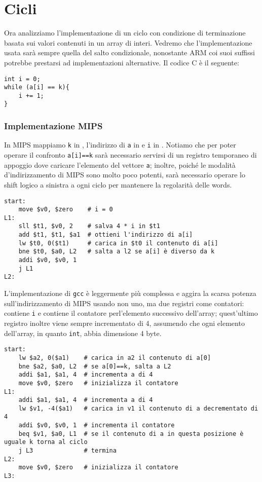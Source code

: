 \documentclass[class=book, crop=false, oneside]{standalone}
\begin{document}
\section{Cicli}
Ora analizziamo l'implementazione di un ciclo con condizione di terminazione basata sui valori contenuti in un array di interi. Vedremo che l'implementazione usata sarà sempre quella del salto condizionale, nonostante ARM coi suoi suffissi potrebbe prestarsi ad implementazioni alternative. Il codice C è il seguente:
\begin{verbatim}
int i = 0;
while (a[i] == k){
	i += 1;
}
\end{verbatim}

\subsubsection{Implementazione MIPS}
In MIPS mappiamo \texttt{k} in , l'indirizzo di \texttt{a} in  e \texttt{i} in . Notiamo che per poter operare il confronto \texttt{a[i]==k} sarà necessario servirsi di un registro temporaneo  di appoggio dove caricare l'elemento del vettore \texttt{a}; inoltre, poiché le modalità d'indirizzamento di MIPS sono molto poco potenti, sarà necessario operare lo shift logico a sinistra a ogni ciclo per mantenere la regolarità delle words.
\begin{verbatim}
start:
	move $v0, $zero    # i = 0
L1:
	sll $t1, $v0, 2    # salva 4 * i in $t1
	add $t1, $t1, $a1  # ottieni l'indirizzo di a[i]
	lw $t0, 0($t1)     # carica in $t0 il contenuto di a[i]
	bne $t0, $a0, L2   # salta a l2 se a[i] è diverso da k
	addi $v0, $v0, 1
	j L1
L2:
\end{verbatim}

L'implementazione di \texttt{gcc} è leggermente più complessa e aggira la scarsa potenza sull'indirizzamento di MIPS usando non uno, ma due registri come contatori:   contiene \texttt{i} e  contiene il contatore perl'elemento successivo dell'array; quest'ultimo registro inoltre viene sempre incrementato di 4, assumendo che ogni elemento dell'array, in quanto \texttt{int}, abbia dimensione 4 byte.
\begin{verbatim}
start:
	lw $a2, 0($a1)    # carica in a2 il contenuto di a[0]
	bne $a2, $a0, L2  # se a[0]==k, salta a L2
	addi $a1, $a1, 4  # incrementa a di 4
	move $v0, $zero   # inizializza il contatore
L1:
	addi $a1, $a1, 4  # incrementa a di 4
	lw $v1, -4($a1)   # carica in v1 il contenuto di a decrementato di 4
	addi $v0, $v0, 1  # incrementa il contatore
	beq $v1, $a0, L1  # se il contenuto di a in questa posizione è uguale k torna al ciclo
	j L3              # termina
L2:
	move $v0, $zero   # inizializza il contatore
L3:
\end{verbatim}
\end{document}
